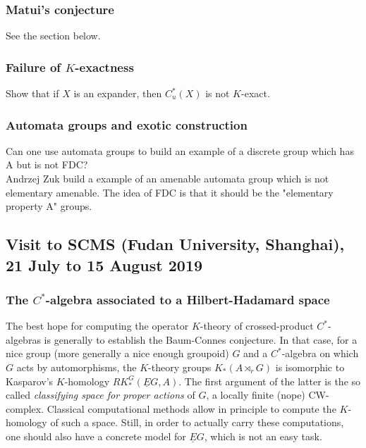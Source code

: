 \subsubsection*{Matui's conjecture}

See the section below.

\subsubsection*{Failure of $K$-exactness}

Show that if $X$ is an expander, then $C^*_u(X)$ is not $K$-exact.

\subsubsection*{Automata groups and exotic construction}

Can one use automata groups to build an example of a discrete group which has A but is not FDC?\\

Andrzej Zuk build a example of an amenable automata group which is not elementary amenable. The idea of FDC is that it should be the "elementary property A" groups.

\newpage
\subsection{Visit to SCMS (Fudan University, Shanghai), 21 July to 15 August 2019}

\subsubsection*{The $C^*$-algebra associated to a Hilbert-Hadamard space}
The best hope for computing the operator $K$-theory of crossed-product $C^*$-algebras is generally to establish the Baum-Connes conjecture. In that case, for a nice group (more generally a nice enough groupoid) $G$ and a $C^*$-algebra on which $G$ acts by automorphisms, the $K$-theory groups $K_*(A\rtimes_r G)$ is isomorphic to Kasparov's $K$-homology $RK_*^G(\underline E G, A)$. The first argument of the latter is the so called \textit{classifying space for proper actions} of $G$, a locally finite (nope) CW-complex. Classical computational methods allow in principle to compute the $K$-homology of such a space.  Still, in order to actually carry these computations, one should also have a concrete model for $\underline EG$, which is not an easy task.\\

